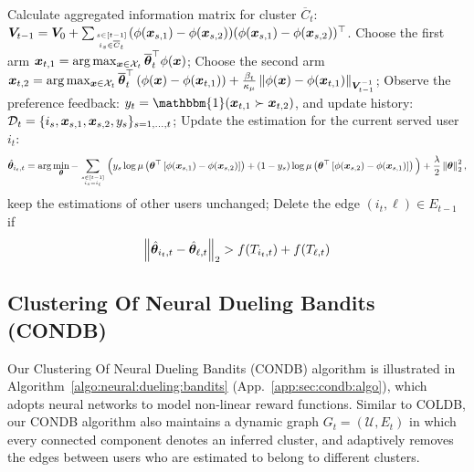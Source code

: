 \begin{algorithm*}[t!]
\begin{algorithmic}[1]
            \STATE Calculate aggregated information matrix for cluster $\overline C_t$: 
            $\boldsymbol{V}_{t-1}=\boldsymbol{V}_0+\sum_{s\in[t-1]\atop i_s\in \overline C_t}(\phi(\boldsymbol{x}_{s,1}) - \phi(\boldsymbol{x}_{s,2}))(\phi(\boldsymbol{x}_{s,1}) - \phi(\boldsymbol{x}_{s,2}))^\top$. 
            \STATE Choose the first arm  $\boldsymbol{x}_{t,1} = \arg\max_{\boldsymbol{x}\in\mathcal{X}_t}\overline{\boldsymbol{\theta}}_t^\top \phi(\boldsymbol{x})$; 
            \STATE Choose the second arm $\boldsymbol{x}_{t,2} = \arg\max_{\boldsymbol{x}\in\mathcal{X}_t} \overline{\boldsymbol{\theta}}_t^\top \left( \phi(\boldsymbol{x}) - \phi(\boldsymbol{x}_{t,1}) \right) + \frac{\beta_t}{\kappa_\mu}\left\| \phi(\boldsymbol{x}) - \phi(\boldsymbol{x}_{t,1}) \right\|_{\boldsymbol{V}_{t-1}^{-1}}$; 
		\STATE Observe the preference feedback: $y_t = \mathbbm{1}(\bx_{t,1}\succ \bx_{t,2})$, and update history: $\mathcal{D}_t=\{i_s, \boldsymbol{x}_{s,1}, \boldsymbol{x}_{s,2}, y_s\}_{s=1,\ldots,t}$;
        \STATE Update the estimation for the current served user $i_t$: 
        \begin{equation}
        \hat{\boldsymbol{\theta}}_{i_t,t}=\arg\min_{\boldsymbol{\theta}} - \sum_{s\in[t-1]\atop i_s=i_t}\Big( y_s\log\mu\left({\boldsymbol{\theta}}^{\top}\left[\phi(\boldsymbol{x}_{s,1}) - \phi(\boldsymbol{x}_{s,2})\right]\right) + (1-y_s)\log\mu\left({\boldsymbol{\theta}}^{\top}\left[\phi(\boldsymbol{x}_{s,2}) - \phi(\boldsymbol{x}_{s,1})\right]\right) \Big) + \frac{\lambda}{2}\left\| \boldsymbol{\theta} \right\|_2^2, 
            \end{equation}
            keep the estimations of other users unchanged;
            \STATE Delete the edge $(i_t,\ell)\in E_{t-1}$ if
            \begin{equation}
                \left\| \hat{\boldsymbol{\theta}}_{i_t,t}-\hat{\boldsymbol{\theta}}_{\ell,t} \right\|_2>f(T_{i_t,t})+f(T_{\ell,t})
            \end{equation} 
		\ENDFOR
	\end{algorithmic}
\end{algorithm*}

\subsection{Clustering Of Neural Dueling Bandits (CONDB)}
\label{subsec:algo:condb}
Our Clustering Of Neural Dueling Bandits (CONDB) algorithm is illustrated in Algorithm~\ref{algo:neural:dueling:bandits} (App.~\ref{app:sec:condb:algo}), which adopts neural networks to model non-linear reward functions.
Similar to COLDB, our CONDB algorithm also maintains a dynamic graph $G_t = (\mathcal{U}, E_t)$ in which every connected component denotes an inferred cluster, and adaptively removes the edges between users who are estimated to belong to different clusters.

